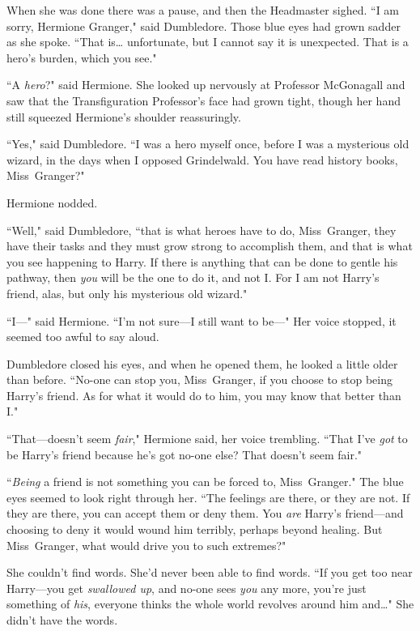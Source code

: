 When she was done there was a pause, and then the Headmaster sighed. ``I am sorry, Hermione Granger," said Dumbledore. Those blue eyes had grown sadder as she spoke. ``That is{\ldots} unfortunate, but I cannot say it is unexpected. That is a hero's burden, which you see."

``A \emph{hero}?" said Hermione. She looked up nervously at Professor McGonagall and saw that the Transfiguration Professor's face had grown tight, though her hand still squeezed Hermione's shoulder reassuringly.

``Yes," said Dumbledore. ``I was a hero myself once, before I was a mysterious old wizard, in the days when I opposed Grindelwald. You have read history books, Miss~Granger?"

Hermione nodded.

``Well," said Dumbledore, ``that is what heroes have to do, Miss~Granger, they have their tasks and they must grow strong to accomplish them, and that is what you see happening to Harry. If there is anything that can be done to gentle his pathway, then \emph{you} will be the one to do it, and not I\@. For I am not Harry's friend, alas, but only his mysterious old wizard."

``I—" said Hermione. ``I'm not sure—I still want to be—" Her voice stopped, it seemed too awful to say aloud.

Dumbledore closed his eyes, and when he opened them, he looked a little older than before. ``No-one can stop you, Miss~Granger, if you choose to stop being Harry's friend. As for what it would do to him, you may know that better than I."

``That—doesn't seem \emph{fair}," Hermione said, her voice trembling. ``That I've \emph{got} to be Harry's friend because he's got no-one else? That doesn't seem fair."

``\emph{Being} a friend is not something you can be forced to, Miss~Granger." The blue eyes seemed to look right through her. ``The feelings are there, or they are not. If they are there, you can accept them or deny them. You \emph{are} Harry's friend—and choosing to deny it would wound him terribly, perhaps beyond healing. But Miss~Granger, what would drive you to such extremes?"

She couldn't find words. She'd never been able to find words. ``If you get too near Harry—you get \emph{swallowed up}, and no-one sees \emph{you} any more, you're just something of \emph{his}, everyone thinks the whole world revolves around him and{\ldots}" She didn't have the words.

